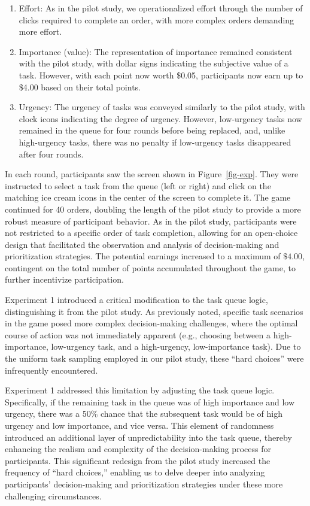 \documentclass[
]{article}
\begin{document}
\begin{enumerate}
\def\labelenumi{\arabic{enumi}.}
\item
  Effort: As in the pilot study, we operationalized effort through the
  number of clicks required to complete an order, with more complex
  orders demanding more effort.
\item
  Importance (value): The representation of importance remained
  consistent with the pilot study, with dollar signs indicating the
  subjective value of a task. However, with each point now worth \$0.05,
  participants now earn up to \$4.00 based on their total points.
\item
  Urgency: The urgency of tasks was conveyed similarly to the pilot
  study, with clock icons indicating the degree of urgency. However,
  low-urgency tasks now remained in the queue for four rounds before
  being replaced, and, unlike high-urgency tasks, there was no penalty
  if low-urgency tasks disappeared after four rounds.
\end{enumerate}

In each round, participants saw the screen shown in
Figure~\ref{fig-exp}. They were instructed to select a task from the
queue (left or right) and click on the matching ice cream icons in the
center of the screen to complete it. The game continued for 40 orders,
doubling the length of the pilot study to provide a more robust measure
of participant behavior. As in the pilot study, participants were not
restricted to a specific order of task completion, allowing for an
open-choice design that facilitated the observation and analysis of
decision-making and prioritization strategies. The potential earnings
increased to a maximum of \(\$4.00\), contingent on the total number of
points accumulated throughout the game, to further incentivize
participation.

Experiment 1 introduced a critical modification to the task queue logic,
distinguishing it from the pilot study. As previously noted, specific
task scenarios in the game posed more complex decision-making
challenges, where the optimal course of action was not immediately
apparent (e.g., choosing between a high-importance, low-urgency task,
and a high-urgency, low-importance task). Due to the uniform task
sampling employed in our pilot study, these ``hard choices'' were
infrequently encountered.

Experiment 1 addressed this limitation by adjusting the task queue
logic. Specifically, if the remaining task in the queue was of high
importance and low urgency, there was a 50\% chance that the subsequent
task would be of high urgency and low importance, and vice versa. This
element of randomness introduced an additional layer of unpredictability
into the task queue, thereby enhancing the realism and complexity of the
decision-making process for participants. This significant redesign from
the pilot study increased the frequency of ``hard choices,'' enabling us
to delve deeper into analyzing participants' decision-making and
prioritization strategies under these more challenging circumstances.
\end{document}
